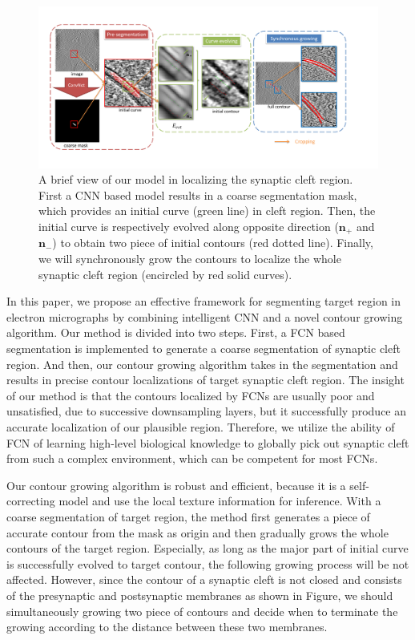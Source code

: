 \begin{figure}[t]
    \begin{center}
        \includegraphics[width=7in]{figs/FigCG.pdf}
   \end{center}
\caption{A brief view of our model in localizing the synaptic cleft region. First a CNN based model results in a coarse segmentation mask, which provides an initial curve (green line) in cleft region.
        Then, the initial curve is respectively evolved along opposite direction ($\mathbf{n}_+$ and $\mathbf{n}_-$) to obtain two piece of initial contours (red dotted line).
        Finally, we will synchronously grow the contours to localize the whole synaptic cleft region (encircled by red solid curves).}
\label{fig:cg}
\end{figure}
In this paper, we propose an effective framework for segmenting target region in electron micrographs by combining intelligent CNN and a novel contour growing algorithm.
Our method is divided into two steps.
First, a FCN based segmentation is implemented to generate a coarse segmentation of synaptic cleft region.
And then, our contour growing algorithm takes in the segmentation and results in precise contour localizations of target synaptic cleft region.
The insight of our method is that the contours localized by FCNs are usually poor and unsatisfied, due to successive downsampling layers\cite{Chen2017}, but it successfully produce an accurate localization of our plausible region.
Therefore, we utilize the ability of FCN of learning high-level biological knowledge to globally pick out synaptic cleft from such a complex environment, which can be competent for most FCNs.

Our contour growing algorithm is robust and efficient, because it is a self-correcting model and use the local texture information for inference.
With a coarse segmentation of target region, the method first generates a piece of accurate contour from the mask as origin and then gradually grows the whole contours of the target region.
Especially, as long as the major part of initial curve is successfully evolved to target contour, the following growing process will be not affected.
However, since the contour of a synaptic cleft is not closed and consists of the presynaptic and postsynaptic membranes as shown in Figure, we should simultaneously growing two piece of contours and decide when to terminate the growing according to the distance between these two membranes.


